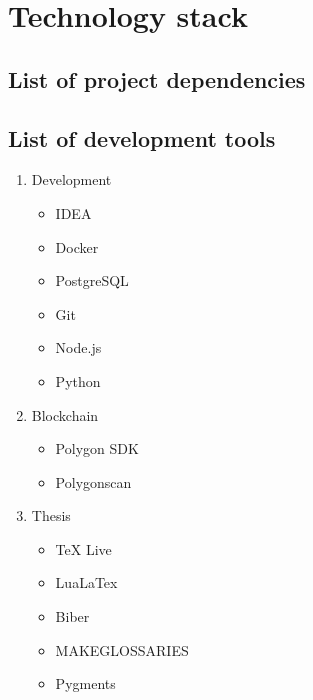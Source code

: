 \chapter{Technology stack}\label{ch:apx-technology-stack}

\section{List of project dependencies}\label{sec:list-of-project-dependencies}


\section{List of development tools}\label{sec:list-of-development-tools}

\begin{enumerate}
    \item Development
    \begin{itemize}
        \item IDEA
        \item Docker
        \item PostgreSQL
        \item Git
        \item Node.js
        \item Python
    \end{itemize}
    \item Blockchain
    \begin{itemize}
        \item Polygon SDK
        \item Polygonscan
    \end{itemize}
    \item Thesis
    \begin{itemize}
        \item TeX Live
        \item LuaLaTex
        \item Biber
        \item MAKEGLOSSARIES
        \item Pygments
    \end{itemize}
\end{enumerate}